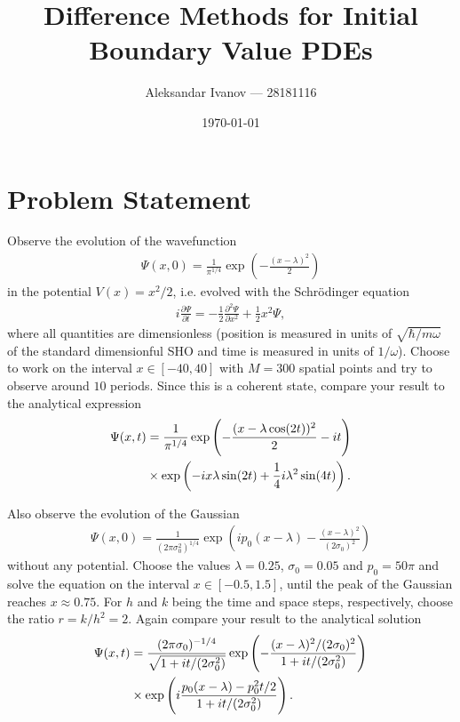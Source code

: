 \documentclass[10pt,a4paper,twocolumn]{article}
\begin{document}
\title{Difference Methods for Initial Boundary Value PDEs}
\author{Aleksandar Ivanov --- 28181116}
\date{\today}
\maketitle

\section{Problem Statement}

Observe the evolution of the wavefunction
%
\begin{align}
    \Psi (x, 0) = \frac{1}{\pi^{1/4}} \exp \left( -\frac{(x - \lambda)^2}{2} \right)
\end{align}
%
in the potential $V(x) = x^2/2$, i.e. evolved with the Schr\"odinger equation
%
\begin{align}
    i \frac{\partial \Psi}{\partial t} = - \frac{1}{2} \frac{\partial^2 \Psi}{\partial x^2} + \frac{1}{2} x^2 \Psi,
\end{align}
%
where all quantities are dimensionless (position is measured in units of $\sqrt{\hbar/m \omega}$ of the standard dimensionful SHO and time is measured in units of $1/\omega$). Choose to work on the interval $x \in [-40, 40]$ with $M = 300$ spatial points and try to observe around $10$ periods. Since this is a coherent state, compare your result to the analytical expression
%
\begin{align}
    \Psi(x, t) &= \frac{1}{\pi^{1/4}} \exp \left( -\frac{(x - \lambda \cos(2t))^2}{2} -i t \right) \notag\\
    &\times \exp \left( - i x \lambda \sin(2t) + \frac{1}{4} i \lambda^2 \sin(4t) \right).  
\end{align}

Also observe the evolution of the Gaussian
%
\begin{align}
    \Psi (x, 0) = \frac{1}{(2 \pi \sigma_0^2)^{1/4}} \exp \left( i p_0 (x - \lambda) - \frac{(x - \lambda)^2}{(2 \sigma_0)^2} \right)
\end{align}
%
without any potential. Choose the values $\lambda = 0.25$, $\sigma_0 = 0.05$ and $p_0 = 50 \pi$ and solve the equation on the interval $x \in [-0.5, 1.5]$, until the peak of the Gaussian reaches $x \approx 0.75$. For $h$ and $k$ being the time and space steps, respectively, choose the ratio $r = k/h^2 = 2$. Again compare your result to the analytical solution
%
\begin{align}
    \Psi(x, t) &= \frac{(2 \pi \sigma_0)^{-1/4}}{\sqrt{1 + i t/(2\sigma_0^2)}} \exp \left( -\frac{(x - \lambda)^2/(2 \sigma_0)^2}{1 + i t/(2\sigma_0^2)} \right) \notag\\
    &\times \exp \left( i\frac{p_0 (x - \lambda) - p_0^2 t /2}{1 + i t/(2\sigma_0^2)} \right).
\end{align}
\end{document}
